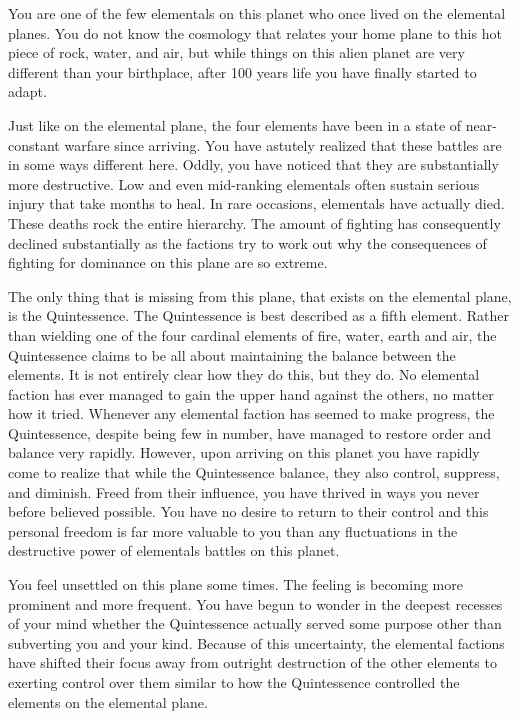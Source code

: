 \documentclass[blue]{elementals}
\begin{document}
\name{\bKnowQ{}}

You are one of the few elementals on this planet who once lived on the elemental planes. You do not know the cosmology that relates your home plane to this hot piece of rock, water, and air, but while things on this alien planet are very different than your birthplace, after 100 years life you have finally started to adapt.

Just like on the elemental plane, the four elements have been in a state of near-constant warfare since arriving. You have astutely realized that these battles are in some ways different here. Oddly, you have noticed that they are substantially more destructive. Low and even mid-ranking elementals often sustain serious injury that take months to heal. In rare occasions, elementals have actually died. These deaths rock the entire hierarchy. The amount of fighting has consequently declined substantially as the factions try to work out why the consequences of fighting for dominance on this plane are so extreme.

The only thing that is missing from this plane, that exists on the elemental plane, is the Quintessence. The Quintessence is best described as a fifth element. Rather than wielding one of the four cardinal elements of fire, water, earth and air, the Quintessence claims to be all about maintaining the balance between the elements. It is not entirely clear how they do this, but they do. No elemental faction has ever managed to gain the upper hand against the others, no matter how it tried. Whenever any elemental faction has seemed to make progress, the Quintessence, despite being few in number, have managed to restore order and balance very rapidly. However, upon arriving on this planet you have rapidly come to realize that while the Quintessence balance, they also control, suppress, and diminish. Freed from their influence, you have thrived in ways you never before believed possible. You have no desire to return to their control and this personal freedom is far more valuable to you than any fluctuations in the destructive power of elementals battles on this planet.

You feel unsettled on this plane some times. The feeling is becoming more prominent and more frequent. You have begun to wonder in the deepest recesses of your mind whether the Quintessence actually served some purpose other than subverting you and your kind. Because of this uncertainty, the elemental factions have shifted their focus away from outright destruction of the other elements to exerting control over them similar to how the Quintessence controlled the elements on the elemental plane.
\end{document}
